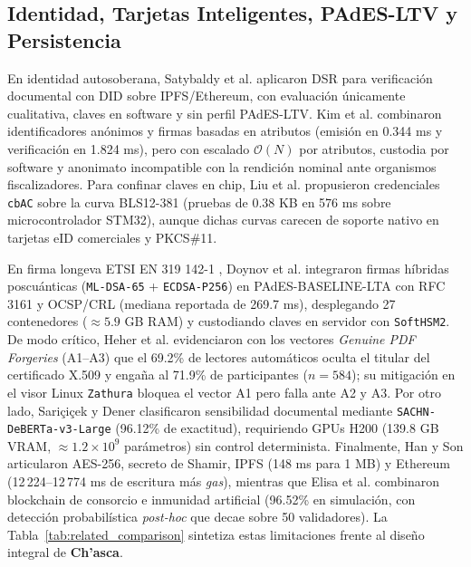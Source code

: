 \documentclass[runningheads,twocolumn]{llncs}
\begin{document}
\subsection{Identidad, Tarjetas Inteligentes, PAdES-LTV y Persistencia}
En identidad autosoberana, Satybaldy et al. \cite{satybaldy2022} aplicaron DSR para verificación documental con DID sobre IPFS/Ethereum, con evaluación únicamente cualitativa, claves en software y sin perfil PAdES-LTV. Kim et al. \cite{kim2025} combinaron identificadores anónimos y firmas basadas en atributos (emisión en 0.344 ms y verificación en 1.824 ms), pero con escalado $\mathcal{O}(N)$ por atributos, custodia por software y anonimato incompatible con la rendición nominal ante organismos fiscalizadores. Para confinar claves en chip, Liu et al. \cite{liu2026} propusieron credenciales \texttt{cbAC} sobre la curva BLS12-381 (pruebas de 0.38 KB en 576 ms sobre microcontrolador STM32), aunque dichas curvas carecen de soporte nativo en tarjetas eID comerciales y PKCS\#11.

En firma longeva ETSI EN 319 142-1 \cite{etsi2024}, Doynov et al. \cite{doynov2026} integraron firmas híbridas poscuánticas (\texttt{ML-DSA-65} + \texttt{ECDSA-P256}) en PAdES-BASELINE-LTA con RFC 3161 y OCSP/CRL (mediana reportada de 269.7 ms), desplegando 27 contenedores ($\approx 5.9$ GB RAM) y custodiando claves en servidor con \texttt{SoftHSM2}. De modo crítico, Heher et al. \cite{heher2027} evidenciaron con los vectores \textit{Genuine PDF Forgeries} (A1--A3) que el 69.2\% de lectores automáticos oculta el titular del certificado X.509 y engaña al 71.9\% de participantes ($n = 584$); su mitigación en el visor Linux \texttt{Zathura} bloquea el vector A1 pero falla ante A2 y A3. Por otro lado, Sari\c{c}i\c{c}ek y Dener \cite{saricicek2026} clasificaron sensibilidad documental mediante \texttt{SACHN-DeBERTa-v3-Large} (96.12\% de exactitud), requiriendo GPUs H200 (139.8 GB VRAM, $\approx 1.2 \times 10^9$ parámetros) sin control determinista. Finalmente, Han y Son \cite{han2025} articularon AES-256, secreto de Shamir, IPFS (148 ms para 1 MB) y Ethereum (12\,224--12\,774 ms de escritura más \textit{gas}), mientras que Elisa et al. \cite{elisa2023} combinaron blockchain de consorcio e inmunidad artificial (96.52\% en simulación, con detección probabilística \textit{post-hoc} que decae sobre 50 validadores). La Tabla~\ref{tab:related_comparison} sintetiza estas limitaciones frente al diseño integral de \textbf{Ch'asca}.
\end{document}
